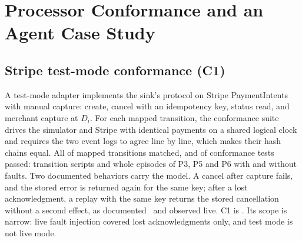 \section{Processor Conformance and an Agent Case Study}\label{sec:casestudy}

\subsection{Stripe test-mode conformance (C1)}\label{sec:casestudy:c1}
A test-mode adapter implements the sink's protocol on Stripe PaymentIntents with manual capture: create, cancel with an idempotency key, status read, and merchant capture at $D_i$. For each mapped transition, the conformance suite drives the simulator and Stripe with identical payments on a shared logical clock and requires the two event logs to agree line by line, which makes their hash chains equal. All \StripeMappingRowsMatched{} of \StripeMappingRows{} mapped transitions matched, and \StripeTestsPassed{} of \StripeTestsRun{} conformance tests passed: \StripeTransitionScripts{} transition scripts and \StripeEpisodes{} whole episodes of P3, P5 and P6 with and without faults. Two documented behaviors carry the model. A cancel after capture fails, and the stored error is returned again for the same key; after a lost acknowledgment, a replay with the same key returns the stored cancellation without a second effect, as documented~\cite{stripe2026idempotency} and observed live. C1 is \VerdictCOne. Its scope is narrow: live fault injection covered lost acknowledgments only, and test mode is not live mode.

